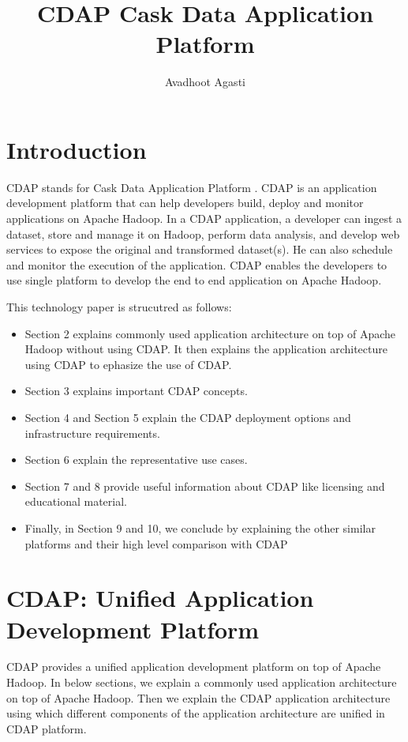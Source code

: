 \documentclass[9pt,twocolumn,twoside]{styles/osajnl}
\title{CDAP Cask Data Application Platform}
\author[1,*, +]{Avadhoot Agasti}
\affil[1]{School of Informatics and Computing, Bloomington, IN 47408, U.S.A.}
\affil[*]{Corresponding authors: aagasti@indiana.edu}
\affil[+]{HID - SL-IO-3000}
\begin{document}
\maketitle

\section{Introduction}

CDAP stands for Cask Data Application Platform \cite{www-cask-io}. CDAP is an
application development platform that can help developers build, deploy and
 monitor applications on Apache Hadoop. In a CDAP application, a
 developer can ingest a dataset, store and manage it on Hadoop, perform
 data analysis, and develop web services to expose the original and
 transformed dataset(s). He can also schedule and monitor the execution of
 the application. CDAP enables the developers to use single platform to
 develop the end to end application on Apache Hadoop.

This technology paper is strucutred as follows:
\begin{itemize}
\item Section 2 explains commonly used application architecture on top of
Apache Hadoop without using CDAP. It then explains the application
architecture using CDAP to ephasize the use of CDAP.
\item Section 3 explains important CDAP concepts.
\item Section 4 and Section 5 explain the CDAP deployment options and
infrastructure requirements.
\item Section 6 explain the representative use cases.
\item Section 7 and 8 provide useful information about CDAP like licensing
and educational material.
\item Finally, in Section 9 and 10, we conclude by explaining the other similar
platforms and their high level comparison with CDAP
\end{itemize}

\section{CDAP: Unified Application Development Platform}
CDAP provides a unified application development platform on top of Apache
Hadoop. In below sections, we explain a commonly used application
architecture on top of Apache Hadoop. Then we explain the CDAP application
architecture using which different components of the application architecture
 are unified in CDAP platform.
\end{document}
